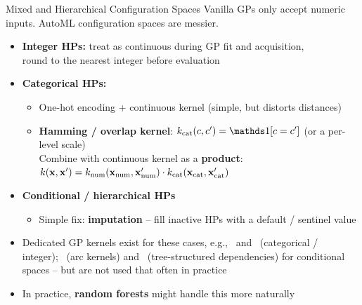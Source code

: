 \documentclass[main]{subfiles}
\begin{document}
\begin{frame}[t]{Mixed and Hierarchical Configuration Spaces}
  \footnotesize
  Vanilla GPs only accept numeric inputs. AutoML configuration spaces are messier.
  \begin{itemize}
    \item \textbf{Integer HPs:} treat as continuous during GP fit and acquisition,\\
    round to the nearest integer before evaluation
    \item \textbf{Categorical HPs:}
        \begin{itemize}
            \item One-hot encoding + continuous kernel (simple, but distorts distances)
            \item \textbf{Hamming / overlap kernel}: $k_{\text{cat}}(c, c') = \ind[c = c']$ (or a per-level scale)\\
            Combine with continuous kernel as a \textbf{product}: $k(\mathbf{x}, \mathbf{x}') = k_{\text{num}}(\mathbf{x}_{\text{num}}, \mathbf{x}'_{\text{num}}) \cdot k_{\text{cat}}(\mathbf{x}_{\text{cat}}, \mathbf{x}'_{\text{cat}})$
        \end{itemize}
    \item \textbf{Conditional / hierarchical HPs}
        \begin{itemize}
            \item Simple fix: \textbf{imputation} -- fill inactive HPs with a default / sentinel value
        \end{itemize}
    \item Dedicated GP kernels exist for these cases, e.g.,~ and~ (categorical / integer);~ (arc kernels) and~ (tree-structured dependencies) for conditional spaces -- but are not used that often in practice
    \item In practice, \textbf{random forests} might handle this more naturally
  \end{itemize}
\end{frame}
\end{document}
